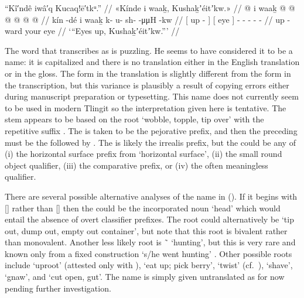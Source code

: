 \ex\label{ex:91-189-eyes-up}%
%
\begingl
	\glpreamble	“Kî′ndê iwâ′q Kucaq!ē′tkᵘ.” //
	\glpreamble	«\!Kínde i waaḵ, Kushaḵʼéitʼkw.\!» //
	\gla	{}  @ {} {}
		{} i waaḵ {}
		 @ {} @ {} @ {} @ {} @ {} @ {} //
	\glb	{} kín -dé {}
		{} i waaḵ {}
		k- u- sh-  -μμH -kw //
	\glc	{}[ up - {}]
		{}[  eye {}]
		- - -  - - //
	\gld	{} up -ward {}
		{} your eye {}
		 {} {} {} {} {} {} //
	\glft	‘“Eyes up, Kushaḵʼéitʼkw.”’
		//
\endgl
\xe

The word that \citeauthor{swanton:1909} transcribes as  is puzzling.
He seems to have considered it to be a name: it is capitalized and there is no translation either in the English translation or in the gloss.
The form  in the translation is slightly different from the form  in the transcription, but this variance is plausibly a result of copying errors either during manuscript preparation or typesetting.
This name does not currently seem to be used in modern Tlingit so the interpretation given here is tentative.
The stem appears to be  based on the root  ‘wobble, topple, tip over’ with the repetitive suffix .
The  is taken to be the pejorative  prefix, and then the preceding  must be the  followed by .
The  is likely the irrealis prefix, but the  could be any of
(i) the horizontal surface prefix from  ‘horizontal surface’,
(ii) the small round object qualifier,
(iii) the comparative prefix,
or (iv) the often meaningless  qualifier.

There are several possible alternative analyses of the name in (\lastx).
If it begins with  [] rather than  [] then the  could be the incorporated noun  ‘head’ which would entail the absence of overt classifier prefixes.
The root could alternatively be  ‘tip out, dump out, empty out container’, but note that this root is bivalent rather than monovalent.
Another less likely root is  \~\  ‘hunting’, but this is very rare and known only from a fixed construction  ‘s/he went hunting’ \parencites[f04/36]{leer:1973}[64]{leer:1978b}.
Other possible roots include  ‘uproot’ (attested only with ),  ‘eat up; pick berry’,  ‘twist’ (cf.\ ),  ‘shave’,  ‘gnaw’, and  ‘cut open, gut’.
The name is simply given untranslated as  for now pending further investigation.

